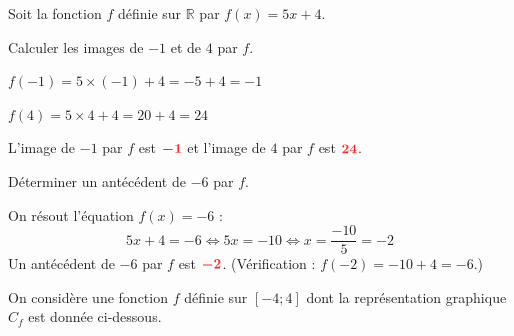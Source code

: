 \documentclass[11pt,a4paper]{article}  %
\begin{document}
	\graphicspath{{images/}}
	
	\begin{center}
	\end{center}
	
	
	Soit la fonction $f$ définie sur $\mathbb{R}$ par $f(x)=5x+4$.
	\begin{enumMet}
		\item Calculer les images de $-1$ et de $4$ par $f$.
		
		\begin{corrBox}
			$f(-1)=5\times(-1)+4=-5+4=-1$ \quad {}
			
			$f(4)=5\times 4+4=20+4=24$ \quad {}
			
			L'image de $-1$ par $f$ est $\mRouge{-1}$ et l'image de $4$ par $f$ est $\mRouge{24}$.
		\end{corrBox}
		
		\item Déterminer un antécédent de $-6$ par $f$. \quad \bareme{1}
		
		\begin{corrBox}
			On résout l'équation $f(x)=-6$ :
			\[5x+4=-6 \iff 5x=-10 \iff x=\dfrac{-10}{5}=-2\]
			Un antécédent de $-6$ par $f$ est $\mRouge{-2}$. \quad (Vérification : $f(-2)=-10+4=-6$.)
		\end{corrBox}
	\end{enumMet}
	
	
	On considère une fonction $f$ définie sur $[-4;4]$ dont la représentation graphique $C_f$ est donnée ci-dessous.
	
\end{document}
